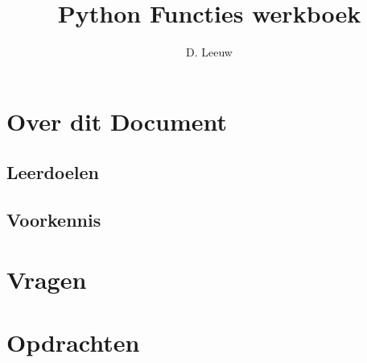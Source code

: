 \documentclass[a4paper,12pt,twoside,openright,titlepage]{article}
\author{D. Leeuw}
\title{Python Functies werkboek}
\date{\today\\
1.0.0\\
\vfill
\raggedright
\copyright\ 2025 Dennis Leeuw\\
}
\begin{document}

\maketitle


\section{Over dit Document}
\subsection{Leerdoelen}

\subsection{Voorkennis}



\section{Vragen}


\section{Opdrachten}


\printindex
\end{document}
